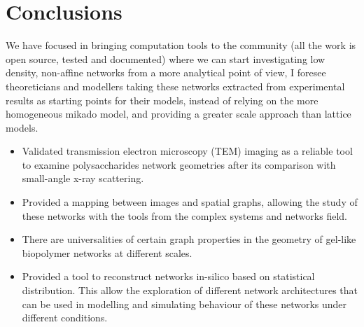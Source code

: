 \section{Conclusions}%
\label{sub:conclusions_conclusions}

We have focused in bringing computation tools to the community (all the work is open source, tested and documented) where we can start investigating low density, non-affine networks from a more analytical point of view, I foresee theoreticians and modellers taking these networks extracted from experimental results as starting points for their models, instead of relying on the more homogeneous mikado model, and providing a greater scale approach than lattice models.

\begin{itemize}[topsep=0pt]
  \item Validated transmission electron microscopy (TEM) imaging as a reliable tool to examine polysaccharides network geometries after its comparison with small-angle x-ray scattering.
  \item Provided a mapping between images and spatial graphs, allowing the study of these networks with the tools from the complex systems and networks field.
  \item There are universalities of certain graph properties in the geometry of gel-like biopolymer networks at different scales.
  \item Provided a tool to reconstruct networks in-silico based on statistical distribution. This allow the exploration of different network architectures that can be used in modelling and simulating behaviour of these networks under different conditions.
\end{itemize}

